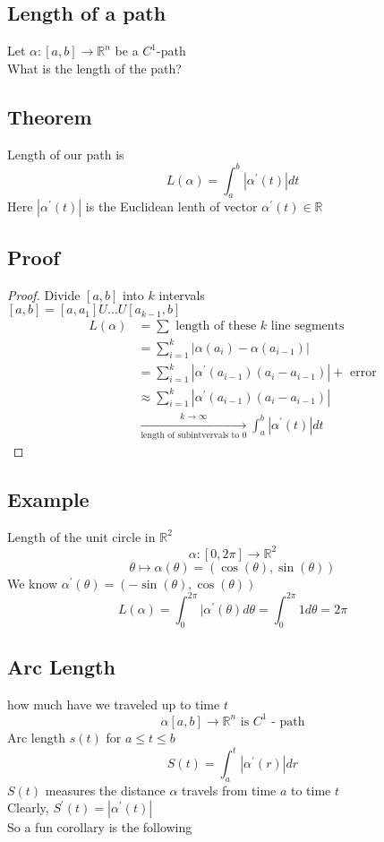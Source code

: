 \documentclass[12pt]{article}
\newcommand{\BR}{\mathbb R}
\newcommand{\prm}{^\prime}
\begin{document}
  \subsection*{Length of a path}
    Let $\alpha:[a,b]\rightarrow\BR^n$ be a $C^1$-path \\
    What is the length of the path? \\
  \subsection*{Theorem}
    Length of our path is \\
    \[ L(\alpha) = \int_a^b|\alpha\prm(t)|dt \]
    Here $|\alpha\prm(t)|$ is the Euclidean lenth of vector $\alpha\prm(t)\in\BR$ \\
  \subsection*{Proof}
    \begin{proof}
      Divide $[a,b]$ into $k$ intervals \\
      $[a,b]=[a,a_1]U\dots U[a_{k-1},b]$ \\
      \begin{align*}
        L(\alpha) & = \sum\text{ length of these $k$ line segments} \\
        & = \sum_{i=1}^k|\alpha(a_i)-\alpha(a_{i-1})| \\
        & = \sum_{i=1}^k|\alpha\prm(a_{i-1})(a_i-a_{i-1})|+\text{ error} \\
        & \approx\sum_{i=1}^k|\alpha\prm(a_{i-1})(a_i-a_{i-1})| \\
        & \xrightarrow[\text{length of subintvervals to 0}]{k\rightarrow\infty}\int_a^b|\alpha\prm(t)|dt
      \end{align*}
    \end{proof}
  \subsection*{Example}
    Length of the unit circle in $\BR^2$ \\
    \[ \alpha:[0,2\pi]\rightarrow\BR^2 \]
    \[ \theta\mapsto\alpha(\theta)=(\cos(\theta),\sin(\theta)) \]
    We know $\alpha\prm(\theta)=(-\sin(\theta),\cos(\theta))$ \\
    \[ L(\alpha) =\int_0^{2\pi}|\alpha\prm(\theta)d\theta=\int_0^{2\pi}1d\theta=2\pi \]
  \subsection*{Arc Length}
    how much have we traveled up to time $t$ \\
    \[ \alpha[a,b]\rightarrow\BR^n \text{ is } C^1\text{ - path} \]
    Arc length $s(t)$ for $a\leq t \leq b$ \\
    \[ S(t) = \int_a^t|\alpha\prm(r)|dr \]
    $S(t)$ measures the distance $\alpha$ travels from time $a$ to time $t$ \\
    Clearly, $S\prm(t)=|\alpha\prm(t)|$ \\
    So a fun corollary is the following \\
\end{document}
